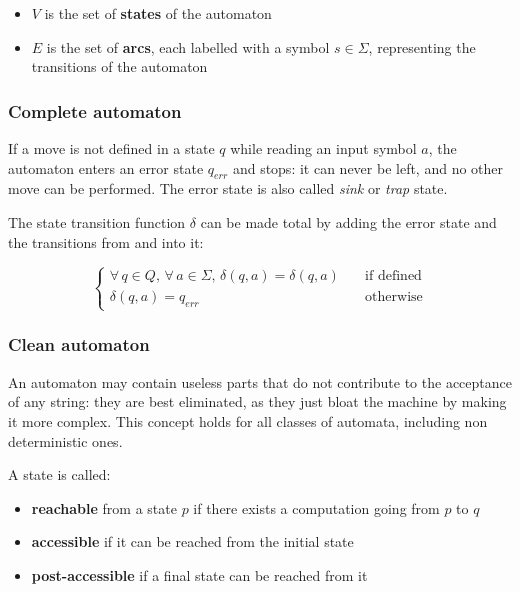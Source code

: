 \documentclass[english]{article}
\begin{document}
\begin{itemize}
  \item \(V\) is the set of \textbf{states} of the automaton
  \item \(E\) is the set of \textbf{arcs}, each labelled with a symbol \(s \in \Sigma\), representing the transitions of the automaton
\end{itemize}

\subsubsection{Complete automaton}

If a move is not defined in a state \(q\) while reading an input symbol \(a\), the automaton enters an error state \(q_\textit{err}\) and stops: it can never be left, and no other move can be performed.
The error state is also called \textit{sink} or \textit{trap} state.

\bigskip
The state transition function \(\delta\) can be made total by adding the error state and the transitions from and into it:

\[\begin{cases}
    \forall \, q \in Q, \, \forall \, a \in \Sigma, \, \delta(q, a) = \delta(q, a) \quad & \text{if defined} \\
    \delta(q, a)= q_\textit{err} \quad                                                   & \text{otherwise}
  \end{cases}\]

\subsubsection{Clean automaton}
\label{sec:clean-automaton}

An automaton may contain useless parts that do not contribute to the acceptance of any string: they are best eliminated, as they just bloat the machine by making it more complex.
This concept holds for all classes of automata, including non deterministic ones.

A state is called:
\begin{itemize}
  \item \textbf{reachable} from a state \(p\) if there exists a computation going from \(p\) to \(q\)
  \item \textbf{accessible} if it can be reached from the initial state
  \item \textbf{post-accessible} if a final state can be reached from it
\end{itemize}
\end{document}
